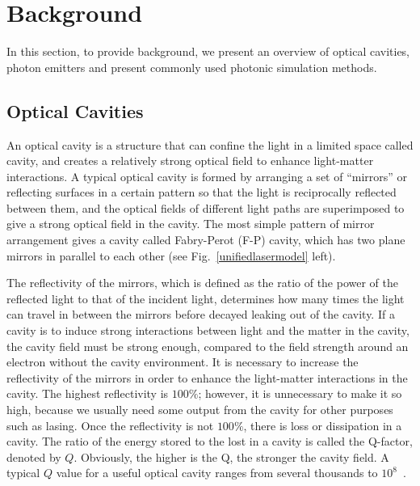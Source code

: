 \section{Background}
In this section, to provide background, we present an overview of optical cavities, photon emitters and present commonly used photonic simulation methods.

\subsection{Optical Cavities}
An optical cavity is a structure that can confine the light in a limited space called cavity, and creates a relatively strong optical field to enhance light-matter interactions. A typical optical cavity is formed by arranging a set of ``mirrors'' or reflecting surfaces in a certain pattern so that the light is reciprocally reflected between them, and the optical fields of different light paths are superimposed to give a strong optical field in the cavity. The most simple pattern of mirror arrangement gives a cavity called Fabry-Perot (F-P) cavity, which has two plane mirrors in parallel to each other (see Fig.~\ref{unifiedlasermodel} left).

The reflectivity of the mirrors, which is defined as the ratio of the power of the reflected light to that of the incident light, determines how many times the light can travel in between the mirrors before decayed leaking out of the cavity. If a cavity is to induce strong interactions between light and the matter in the cavity, the cavity field must be strong enough, compared to the field strength around an electron without the cavity environment. It is necessary to increase the reflectivity of the mirrors in order to enhance the light-matter interactions in the cavity. The highest reflectivity is $100\%$; however, it is unnecessary to make it so high, because we usually need some output from the cavity for other purposes such as lasing. Once the reflectivity is not $100\%$, there is loss or dissipation in a cavity. The ratio of the energy stored to the lost in a cavity is called the Q-factor, denoted by $Q$. Obviously, the higher is the Q, the stronger the cavity field. A typical $Q$ value for a useful optical cavity ranges from several thousands to $10^8$~\cite{Vahala2003}.


